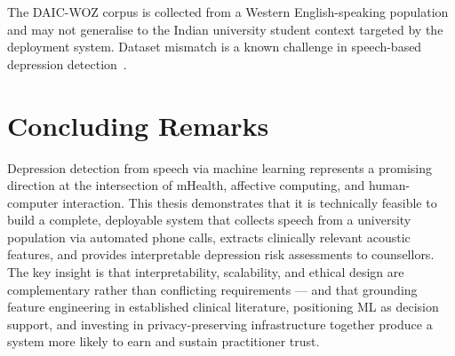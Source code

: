 The DAIC-WOZ corpus is collected from a Western English-speaking population and may not generalise to the Indian university student context targeted by the deployment system. Dataset mismatch is a known challenge in speech-based depression detection~\cite{Leal2024}.

\section{Concluding Remarks}

Depression detection from speech via machine learning represents a promising direction at the intersection of mHealth, affective computing, and human-computer interaction. This thesis demonstrates that it is technically feasible to build a complete, deployable system that collects speech from a university population via automated phone calls, extracts clinically relevant acoustic features, and provides interpretable depression risk assessments to counsellors. The key insight is that interpretability, scalability, and ethical design are complementary rather than conflicting requirements — and that grounding feature engineering in established clinical literature, positioning ML as decision support, and investing in privacy-preserving infrastructure together produce a system more likely to earn and sustain practitioner trust.
